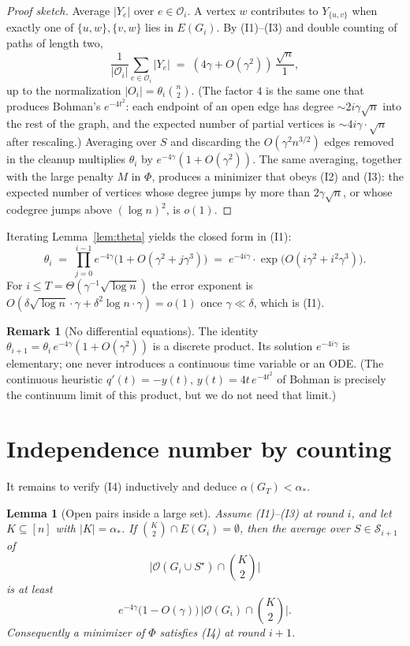 \documentclass[11pt]{article}
\newtheorem{lemma}[theorem]{Lemma}
\theoremstyle{definition}
\newtheorem{remark}[theorem]{Remark}
\newcommand{\cO}{\mathcal{O}}
\newcommand{\bin}[2]{\binom{#1}{#2}}
\begin{document}
\begin{proof}[Proof sketch]
Average $|Y_e|$ over $e\in\cO_i$.
A vertex $w$ contributes to $Y_{\{u,v\}}$ when exactly one of $\{u,w\},\{v,w\}$ lies in $E(G_i)$.
By (I1)--(I3) and double counting of paths of length two,
\[
  \frac1{|\cO_i|}\sum_{e\in\cO_i}|Y_e|
  \;=\;
  (4\gamma+O(\gamma^{2}))\,\frac{\sqrt{n}}{1},
\]
up to the normalization $|O_i|=\theta_i\bin{n}{2}$.
(The factor $4$ is the same one that produces Bohman's $e^{-4t^{2}}$: each endpoint of an open edge has degree $\sim 2i\gamma\sqrt{n}$ into the rest of the graph, and the expected number of partial vertices is $\sim 4i\gamma\cdot\sqrt{n}$ after rescaling.)
Averaging over $S$ and discarding the $O(\gamma^{2}n^{3/2})$ edges removed in the cleanup multiplies $\theta_i$ by $e^{-4\gamma}(1+O(\gamma^{2}))$.
The same averaging, together with the large penalty $M$ in $\Phi$, produces a minimizer that obeys (I2) and (I3): the expected number of vertices whose degree jumps by more than $2\gamma\sqrt{n}$, or whose codegree jumps above $(\log n)^{2}$, is $o(1)$.
\end{proof}

Iterating Lemma~\ref{lem:theta} yields the closed form in (I1):
\[
  \theta_i
  \;=\;
  \prod_{j=0}^{i-1} e^{-4\gamma}\bigl(1+O(\gamma^{2}+j\gamma^{3})\bigr)
  \;=\;
  e^{-4i\gamma}\cdot\exp\bigl(O(i\gamma^{2}+i^{2}\gamma^{3})\bigr).
\]
For $i\le T=\Theta(\gamma^{-1}\sqrt{\log n})$ the error exponent is $O(\delta\sqrt{\log n}\cdot\gamma+\delta^{2}\log n\cdot\gamma)=o(1)$ once $\gamma\ll\delta$, which is (I1).

\begin{remark}[No differential equations]
The identity $\theta_{i+1}=\theta_i\,e^{-4\gamma}(1+O(\gamma^{2}))$ is a discrete product.
Its solution $e^{-4i\gamma}$ is elementary; one never introduces a continuous time variable or an ODE.
(The continuous heuristic $q'(t)=-y(t)$, $y(t)=4t\,e^{-4t^{2}}$ of Bohman is precisely the continuum limit of this product, but we do not need that limit.)
\end{remark}

\section{Independence number by counting}\label{sec:alpha}

It remains to verify (I4) inductively and deduce $\alpha(G_T)<\alpha_{*}$.

\begin{lemma}[Open pairs inside a large set]\label{lem:openK}
Assume (I1)--(I3) at round $i$, and let $K\subseteq[n]$ with $|K|=\alpha_{*}$.
If $\bin{K}{2}\cap E(G_i)=\emptyset$, then the average over $S\in\mathcal{S}_{i+1}$ of
\[
  \bigl|\cO(G_i\cup S^\star)\cap\bin{K}{2}\bigr|
\]
is at least
\[
  e^{-4\gamma}\bigl(1-O(\gamma)\bigr)\,
  \bigl|\cO(G_i)\cap\bin{K}{2}\bigr|.
\]
Consequently a minimizer of $\Phi$ satisfies (I4) at round $i+1$.
\end{lemma}
\end{document}
